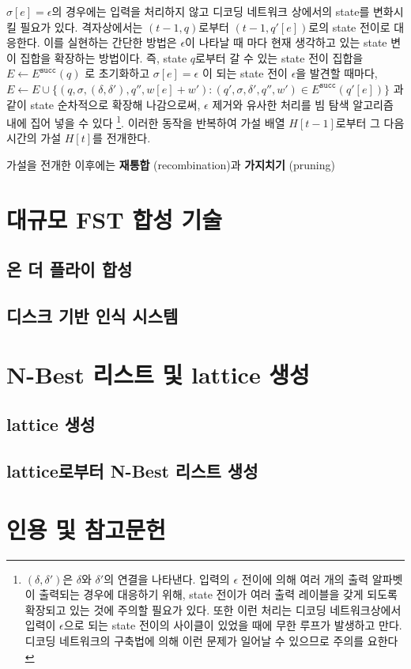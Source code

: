 \documentclass[../main.tex]{subfiles}
\begin{document}
$\sigma[e] = \epsilon$의 경우에는 입력을 처리하지 않고 디코딩 네트워크 상에서의 state를 변화시킬 필요가 있다. 
격자상에서는 $(t-1, q)$로부터 $(t-1, q'[e])$로의 state 전이로 대응한다. 
이를 실현하는 간단한 방법은 $\epsilon$이 나타날 때 마다 현재 생각하고 있는 state 변이 집합을 확장하는 방법이다. 
즉, state $q$로부터 갈 수 있는 state 전이 집합을 $E \leftarrow E^{\texttt{succ}}(q)$ 로 초기화하고 
$\sigma[e] = \epsilon$ 이 되는 state 전이 $\epsilon$을 발견할 때마다, 
$E \leftarrow E \cup \{ ( q, \sigma, (\delta, \delta'), q'', w[e] + w'): (q', \sigma, \delta', q'', w') \in E^{\texttt{succ}}(q'[e])\}$ 과 같이 state 순차적으로 확장해 나감으로써, 
$\epsilon$ 제거와 유사한 처리를 빔 탐색 알고리즘 내에 집어 넣을 수 있다
\footnote{$(\delta, \delta')$은 $\delta$와 $\delta'$의 연결을 나타낸다. 
입력의 $\epsilon$ 전이에 의해 여러 개의 출력 알파벳이 출력되는 경우에 대응하기 위해, state 전이가 여러 출력 레이블을 갖게 되도록 확장되고 있는 것에 주의할 필요가 있다. 또한 이런 처리는 디코딩 네트워크상에서 입력이 $\epsilon$으로 되는 state 전이의 사이클이 있었을 때에 무한 루프가 발생하고 만다. 디코딩 네트워크의 구축법에 의해 이런 문제가 일어날 수 있으므로 주의를 요한다}.
이러한 동작을 반복하여 가설 배열 $H[t-1]$로부터 그 다음 시간의 가설 $H[t]$를 전개한다. 

가설을 전개한 이후에는 \textbf{재통합} (recombination)과 \textbf{가지치기} (pruning)



\section{대규모 FST 합성 기술}
\subsection{온 더 플라이 합성}
\subsection{디스크 기반 인식 시스템}

\section{N-Best 리스트 및 lattice 생성}
\subsection{lattice 생성}
\subsection{lattice로부터 N-Best 리스트 생성}

\section*{인용 및 참고문헌}
\end{document}
